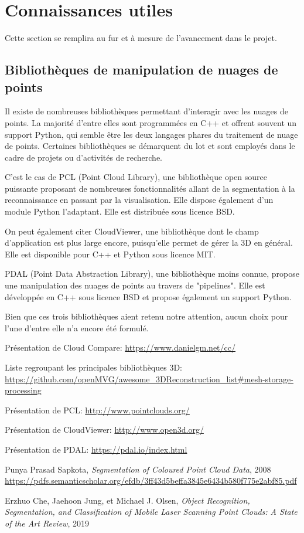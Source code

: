 \documentclass[12pt,titlepage,french]{article}
\begin{document}
\section{Connaissances utiles}

Cette section se remplira au fur et à mesure de l'avancement dans le projet.

\subsection*{Bibliothèques de manipulation de nuages de points}
Il existe de nombreuses bibliothèques permettant d'interagir avec les nuages de points. La majorité d'entre elles sont programmées en C++ et offrent souvent un support Python, qui semble être les deux langages phares du traitement de nuage de points.
Certaines bibliothèques se démarquent du lot et sont employés dans le cadre de projets ou d'activités de recherche.

C'est le cas de PCL (Point Cloud Library), une bibliothèque open source puissante proposant de nombreuses fonctionnalités allant de la segmentation à la reconnaissance en passant par la visualisation. Elle dispose également d'un module Python l'adaptant. Elle est distribuée sous licence BSD.

On peut également citer CloudViewer, une bibliothèque dont le champ d'application est plus large encore, puisqu'elle permet de gérer la 3D en général. Elle est disponible pour C++ et Python sous licence MIT.

PDAL (Point Data Abstraction Library), une bibliothèque moins connue, propose une manipulation des nuages de points au travers de "pipelines". Elle est développée en C++ sous licence BSD et propose également un support Python.

Bien que ces trois bibliothèques aient retenu notre attention, aucun choix pour l'une d'entre elle n'a encore été formulé. 

\newpage
\begin{thebibliography}{9}
 Présentation de Cloud Compare:
\url{https://www.danielgm.net/cc/}

 Liste regroupant les principales bibliothèques 3D:
\url{https://github.com/openMVG/awesome_3DReconstruction_list#mesh-storage-processing}

 Présentation de PCL:
\url{http://www.pointclouds.org/}

 Présentation de CloudViewer:
\url{http://www.open3d.org/}

 Présentation de PDAL:
\url{https://pdal.io/index.html}

 Punya Prasad Sapkota, \textit{Segmentation of Coloured Point Cloud Data}, 2008
\url{https://pdfs.semanticscholar.org/efdb/3ff43d5beffa3845e6434b580f775e2abf85.pdf}

 Erzhuo Che, Jaehoon Jung, et Michael J. Olsen, \textit{Object Recognition, Segmentation, and Classification of Mobile Laser Scanning Point Clouds: A State of the Art Review}, 2019
\end{thebibliography}
\end{document}
